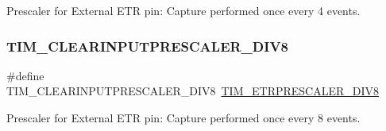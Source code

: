 Prescaler for External E\+TR pin\+: Capture performed once every 4 events. \mbox{\label{group___t_i_m___clear_input___prescaler_ga34bc6cb7ee8800cc48b1ee6c536859cc}} 
\subsubsection{\texorpdfstring{TIM\_CLEARINPUTPRESCALER\_DIV8}{TIM\_CLEARINPUTPRESCALER\_DIV8}}
{\footnotesize\ttfamily \#define T\+I\+M\+\_\+\+C\+L\+E\+A\+R\+I\+N\+P\+U\+T\+P\+R\+E\+S\+C\+A\+L\+E\+R\+\_\+\+D\+I\+V8~\mbox{\hyperlink{group___t_i_m___e_t_r___prescaler_ga834e38200874cced108379b17a24d0b7}{T\+I\+M\+\_\+\+E\+T\+R\+P\+R\+E\+S\+C\+A\+L\+E\+R\+\_\+\+D\+I\+V8}}}

Prescaler for External E\+TR pin\+: Capture performed once every 8 events. 
